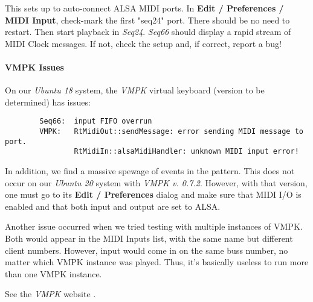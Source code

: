    This sets up to auto-connect ALSA MIDI ports.  In
   \textbf{Edit / Preferences / MIDI Input}, check-mark the first
   "seq24" port.  There should be no need to restart.
   Then start playback in \textsl{Seq24}.
   \textsl{Seq66} should display a rapid stream of MIDI Clock messages.
   If not, check the setup and, if correct, report a bug!

\paragraph{VMPK Issues}
\label{paragraph:alsa_testing_vmpk_issues}

   On our \textsl{Ubuntu 18} system, the \textsl{VMPK} virtual keyboard
   (version to be determined) has issues:

   \begin{verbatim}
        Seq66:  input FIFO overrun
        VMPK:   RtMidiOut::sendMessage: error sending MIDI message to port.
                RtMidiIn::alsaMidiHandler: unknown MIDI input error!
   \end{verbatim}

   In addition, we find a massive spewage of events in the pattern.
   This does not occur on our \textsl{Ubuntu 20} system with
   \textsl{VMPK v. 0.7.2}.
   However, with that version, one must go to its \textbf{Edit / Preferences}
   dialog and make sure that MIDI I/O is enabled and that both input
   and output are set to ALSA.

   Another issue occurred when we tried testing with multiple instances
   of VMPK. Both would appear in the MIDI Inputs list, with the same name but
   different client numbers.  However, input would come in on the same buss
   number, no matter which VMPK instance was played.
   Thus, it's basically useless to run more than one VMPK instance.

   See the \textsl{VMPK} website \cite{vmpk}.


